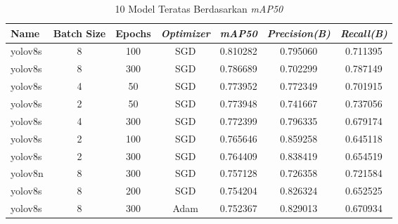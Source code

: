 \begin{table}[h!]
    \centering
    \caption{10 Model Teratas Berdasarkan \textit{mAP50}}
    \begin{tabular}{|l|c|c|c|c|c|c|}
    \hline
    \textbf{Name} & \textbf{Batch Size} & \textbf{Epochs} & \textbf{\textit{Optimizer}} & \textbf{\textit{mAP50}} & \textbf{\textit{Precision(B)}} & \textbf{\textit{Recall(B)}} \\ \hline
    yolov8s       & 8                   & 100             & SGD                         & 0.810282                & 0.795060                      & 0.711395                   \\ \hline
    yolov8s       & 8                   & 300             & SGD                         & 0.786689                & 0.702299                      & 0.787149                   \\ \hline
    yolov8s       & 4                   & 50              & SGD                         & 0.773952                & 0.772349                      & 0.701915                   \\ \hline
    yolov8s       & 2                   & 50              & SGD                         & 0.773948                & 0.741667                      & 0.737056                   \\ \hline
    yolov8s       & 4                   & 300             & SGD                         & 0.772399                & 0.796335                      & 0.679174                   \\ \hline
    yolov8s       & 2                   & 100             & SGD                         & 0.765646                & 0.859258                      & 0.645118                   \\ \hline
    yolov8s       & 2                   & 300             & SGD                         & 0.764409                & 0.838419                      & 0.654519                   \\ \hline
    yolov8n       & 8                   & 300             & SGD                         & 0.757128                & 0.726358                      & 0.721584                   \\ \hline
    yolov8s       & 8                   & 200             & SGD                         & 0.754204                & 0.826324                      & 0.652525                   \\ \hline
    yolov8s       & 8                   & 300             & Adam                        & 0.752367                & 0.829013                      & 0.670934                   \\ \hline
    \end{tabular}
    
    \label{tab:model_teratas_map50}
\end{table}

